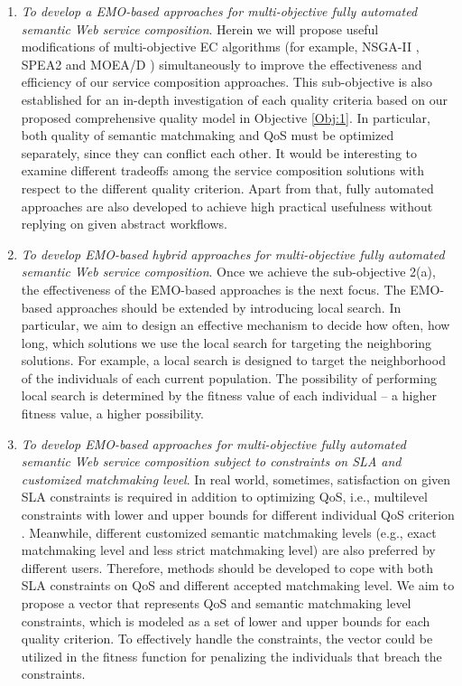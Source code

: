 \begin{enumerate}
\begin{enumerate}
    \item \label{Obj:2.1} \emph{To develop a EMO-based approaches for multi-objective fully automated semantic Web service composition}. Herein we will propose useful modifications of multi-objective EC algorithms (for example, NSGA-II \cite{deb2002fast}, SPEA2 \cite{zitzler2001spea2} and MOEA/D \cite{zhang2007moea}) simultaneously to improve the effectiveness and efficiency of our service composition approaches. This sub-objective is also established for an in-depth investigation of each quality criteria based on our proposed comprehensive quality model in Objective \ref{Obj:1}.  In particular, both quality of semantic matchmaking and QoS must be optimized separately, since they can conflict each other. It would be interesting to examine different tradeoffs among the service composition solutions with respect to the different quality criterion. Apart from that, fully automated approaches are also developed to achieve high practical usefulness without replying on given abstract workflows.
   
    \item \emph{To develop EMO-based hybrid approaches for multi-objective fully automated semantic Web service composition}. Once we achieve the sub-objective 2(a), the effectiveness of the EMO-based approaches is the next focus. The EMO-based approaches should be extended by introducing local search. In particular, we aim to design an effective mechanism to decide how often, how long, which solutions we use the local search for targeting the neighboring solutions. For example, a local search is designed to target the neighborhood of the  individuals of each current population. The possibility of performing local search is determined by the fitness value of each individual -- a higher fitness value, a higher possibility. 

    \item \emph{To develop EMO-based approaches for multi-objective fully automated semantic Web service composition subject to constraints on SLA and customized matchmaking level}. In real world, sometimes, satisfaction on given SLA constraints is required in addition to optimizing QoS, i.e., multilevel constraints with lower and upper bounds for different individual QoS criterion \cite{yin2014hybrid}. Meanwhile, different customized semantic matchmaking levels (e.g., exact matchmaking level and less strict matchmaking level) are also preferred by different users. Therefore, methods should be developed to cope with both SLA constraints on QoS and different accepted matchmaking level. We aim to propose a vector that represents QoS and semantic matchmaking level constraints, which is modeled as a set of lower and upper bounds for each quality criterion. To effectively handle the constraints, the vector could be utilized in the fitness function for penalizing the individuals that breach the constraints.


\end{enumerate}
\end{enumerate}
